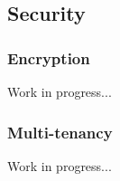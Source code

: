 \documentclass[conference]{IEEEtran}
\begin{document}
\subsection{Security}
\subsubsection{Encryption}
Work in progress...

\subsubsection{Multi-tenancy}
Work in progress...




%
%



%
%
\end{document}
